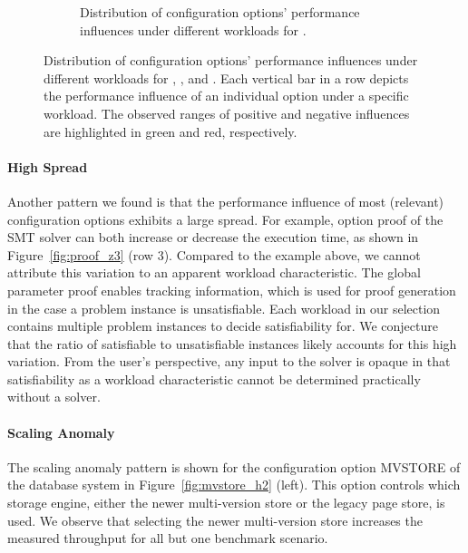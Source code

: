 {{{{\begin{figure}[ht!]
\begin{subfigure}{\linewidth}
		\caption{Distribution of configuration options' performance influences under different workloads for \htwo.}
		\label{fig:overview_h2}
	\end{subfigure}
	
	\caption{Distribution of configuration options' performance influences under different workloads for \jumper, \zdrei, and \htwo. Each vertical bar in a row depicts the performance influence of an individual option under a specific workload. The observed ranges of positive and negative influences are highlighted in green and red, respectively.}
	\label{fig:three_systems}
\end{figure}

\paragraph{High Spread} Another pattern we found is that the performance influence of most (relevant) configuration options exhibits a large spread. For example, option \textsf{proof} of the SMT solver \zdrei can both increase or decrease the execution time, as shown in Figure~\ref{fig:proof_z3} (row 3). Compared to the example above, we cannot attribute this variation to an apparent workload characteristic.
The global parameter \textsf{proof} enables tracking information, which is used for proof generation in the case a problem instance is unsatisfiable. Each workload in our selection contains multiple problem instances to decide satisfiability for. We conjecture that the ratio of satisfiable to unsatisfiable instances likely accounts for this high variation. From the user's perspective, any input to the solver is opaque in that satisfiability as a workload characteristic cannot be determined practically without a solver. 
\paragraph{Scaling Anomaly} The scaling anomaly pattern is shown for the configuration option \textsf{MVSTORE} of the database system \htwo in Figure~\ref{fig:mvstore_h2} (left). This option controls which storage engine, either the newer multi-version store or the legacy page store, is used. We observe that selecting the newer multi-version store increases the measured throughput for all but one benchmark scenario. 

}}}}
